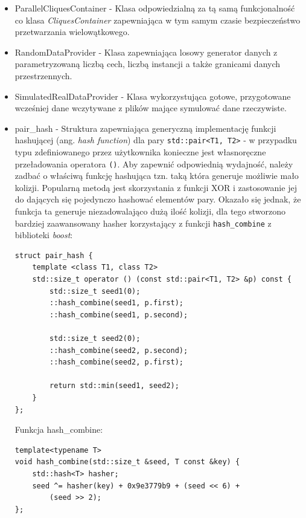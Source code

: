 \documentclass[12pt]{article}
\newcounter{operator}
\def\inline{\lstinline[basicstyle=\ttfamily,keywordstyle={}]}
\begin{document}
\begin{itemize}
\item ParallelCliquesContainer - Klasa odpowiedzialną za tą samą funkcjonalność co klasa \textit{CliquesContainer} zapewniająca w tym samym czasie bezpieczeństwo przetwarzania wielowątkowego.

\item RandomDataProvider - Klasa zapewniająca losowy generator danych z parametryzowaną liczbą cech, liczbą instancji a także granicami danych przestrzennych.

\item SimulatedRealDataProvider - Klasa wykorzystująca gotowe, przygotowane wcześniej dane wczytywane z plików mające symulować dane rzeczywiste.

\item pair\_hash - Struktura zapewniająca generyczną implementację funkcji hashującej (ang. 
\textit{hash function}) dla pary \inline{std::pair<T1, T2>} - w przypadku typu zdefiniowanego przez użytkownika konieczne jest własnoręczne przeładowania operatora \inline{()}. Aby zapewnić odpowiednią wydajność, należy zadbać o właściwą funkcję hashująca tzn. taką która generuje możliwie mało kolizji. Popularną metodą jest skorzystania z funkcji XOR i zastosowanie jej do dających się pojedynczo hashować elementów pary. Okazało się jednak, że funkcja ta generuje niezadowalająco dużą ilość kolizji, dla tego stworzono bardziej zaawansowany hasher korzystający z funkcji \inline{hash_combine} z biblioteki \textit{boost}:
\begin{minipage}{\linewidth}
\begin{lstlisting}[caption={Kod struktury pair\_hash}]
struct pair_hash {
	template <class T1, class T2>
	std::size_t operator () (const std::pair<T1, T2> &p) const {
		std::size_t seed1(0);
		::hash_combine(seed1, p.first);
		::hash_combine(seed1, p.second);

		std::size_t seed2(0);
		::hash_combine(seed2, p.second);
		::hash_combine(seed2, p.first);

		return std::min(seed1, seed2);
	}
};
\end{lstlisting}
\end{minipage}

Funkcja hash\_combine:
\begin{minipage}{\linewidth}
\begin{lstlisting}[caption={Kod funkcji hash\_combine}]
template<typename T>
void hash_combine(std::size_t &seed, T const &key) {
	std::hash<T> hasher;
	seed ^= hasher(key) + 0x9e3779b9 + (seed << 6) + 
    	(seed >> 2);
};
\end{lstlisting}
\end{minipage}


\end{itemize}
\end{document}
